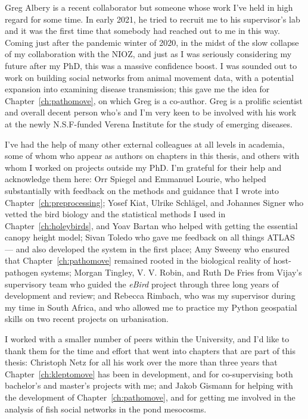 \noindent Greg Albery is a recent collaborator but someone whose work I've held in high regard for some time.
In early 2021, he tried to recruit me to his supervisor's lab and it was the first time that somebody had reached out to me in this way. 
Coming just after the pandemic winter of 2020, in the midst of the slow collapse of my collaboration with the NIOZ, and just as I was seriously considering my future after my PhD, this was a massive confidence boost.
I was sounded out to work on building social networks from animal movement data, with a potential expansion into examining disease transmission; this gave me the idea for Chapter~\ref{ch:pathomove}, on which Greg is a co-author.
Greg is a prolific scientist and overall decent person who's and I'm very keen to be involved with his work at the newly N.S.F-funded Verena Institute for the study of emerging diseases.

\noindent I've had the help of many other external colleagues at all levels in academia, some of whom who appear as authors on chapters in this thesis, and others with whom I worked on projects outside my PhD.
I'm grateful for their help and acknowledge them here:
Orr Spiegel and Emmanuel Lourie, who helped substantially with feedback on the methods and guidance that I wrote into Chapter~\ref{ch:preprocessing};
Yosef Kiat, Ulrike Schl{\"a}gel, and Johannes Signer who vetted the bird biology and the statistical methods I used in Chapter~\ref{ch:holeybirds}, and Yoav Bartan who helped with getting the essential canopy height model;
Sivan Toledo who gave me feedback on all things ATLAS --- and also developed the system in the first place;
Amy Sweeny who ensured that Chapter~\ref{ch:pathomove} remained rooted in the biological reality of host-pathogen systems;
Morgan Tingley, V. V. Robin, and Ruth De Fries from Vijay's supervisory team who guided the \textit{eBird} project through three long years of development and review;
and Rebecca Rimbach, who was my supervisor during my time in South Africa, and who allowed me to practice my Python geospatial skills on two recent projects on urbanisation.

I worked with a smaller number of peers within the University, and I'd like to thank them for the time and effort that went into chapters that are part of this thesis:
Christoph Netz for all his work over the more than three years that Chapter~\ref{ch:kleptomove} has been in development, and for co-supervising both bachelor's and master's projects with me;
and Jakob Gismann for helping with the development of Chapter~\ref{ch:pathomove}, and for getting me involved in the analysis of fish social networks in the pond mesocosms.

